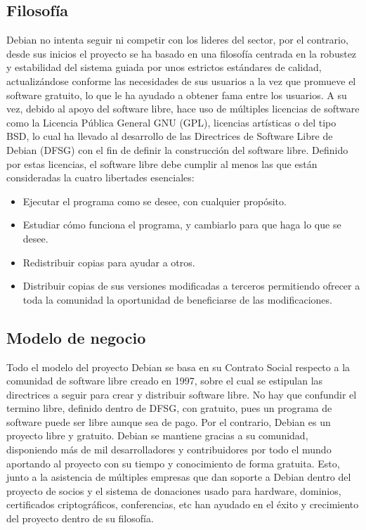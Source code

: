\subsection{Filosofía}
Debian no intenta seguir ni competir con los lideres del sector, por el contrario, desde sus inicios el proyecto se ha basado en una filosofía centrada en la robustez y estabilidad del sistema guiada por unos estrictos estándares de calidad, actualizándose conforme las necesidades de sus usuarios a la vez que promueve el software gratuito, lo que le ha ayudado a obtener fama entre los usuarios.
\newline
\newline
A su vez, debido al apoyo del software libre, hace uso de múltiples licencias de software como la Licencia Pública General GNU (GPL), licencias artísticas o del tipo BSD, lo cual ha llevado al desarrollo de las Directrices de Software Libre de Debian (DFSG) con el fin de definir la construcción del software libre.
\newpage
Definido por estas licencias, el software libre debe cumplir al menos las que están consideradas la cuatro libertades esenciales:
\begin{itemize}
	\item Ejecutar el programa como se desee, con cualquier propósito.
	\item Estudiar cómo funciona el programa, y cambiarlo para que haga lo que se desee.
	\item Redistribuir copias para ayudar a otros.
	\item Distribuir copias de sus versiones modificadas a terceros permitiendo ofrecer a toda la comunidad la oportunidad de beneficiarse de las modificaciones.
\end{itemize}

\subsection{Modelo de negocio}
Todo el modelo del proyecto Debian se basa en su Contrato Social respecto a la comunidad de software libre creado en 1997, sobre el cual se estipulan las directrices a seguir para crear y distribuir software libre.
\newline
\newline
No hay que confundir el termino libre, definido dentro de DFSG, con gratuito, pues un programa de software puede ser libre aunque sea de pago. Por el contrario, Debian es un proyecto libre y gratuito.
\newline
\newline
Debian se mantiene gracias a su comunidad, disponiendo más de mil desarrolladores y contribuidores por todo el mundo aportando al proyecto con su tiempo y conocimiento de forma gratuita. Esto, junto a la asistencia de múltiples empresas que dan soporte a Debian dentro del proyecto de socios y el sistema de donaciones usado para hardware, dominios, certificados criptográficos, conferencias, etc han ayudado en el éxito y crecimiento del proyecto dentro de su filosofía.

